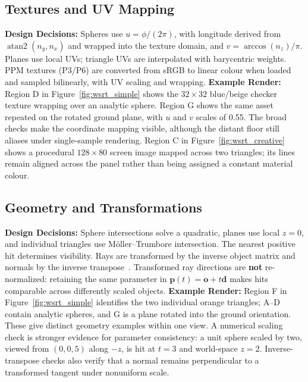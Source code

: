 \documentclass[11pt,a4paper]{article}
\begin{document}
\subsection{Textures and UV Mapping}
\textbf{Design Decisions:} Spheres use \(u=\phi/(2\pi)\), with longitude derived from $\operatorname{atan2}(n_y,n_x)$ and wrapped into the texture domain, and \(v=\arccos(n_z)/\pi\). Planes use local UVs; triangle UVs are interpolated with barycentric weights. PPM textures (P3/P6) are converted from sRGB to linear colour when loaded and sampled bilinearly, with UV scaling and wrapping.
\textbf{Example Render:}
Region D in Figure~\ref{fig:wsrt_simple} shows the $32\times32$ blue/beige checker texture wrapping over an analytic sphere. Region G shows the same asset repeated on the rotated ground plane, with $u$ and $v$ scales of 0.55. The broad checks make the coordinate mapping visible, although the distant floor still aliases under single-sample rendering. Region C in Figure~\ref{fig:wsrt_creative} shows a procedural $128\times80$ screen image mapped across two triangles; its lines remain aligned across the panel rather than being assigned a constant material colour.

\subsection{Geometry and Transformations}
\textbf{Design Decisions:} Sphere intersections solve a quadratic, planes use local $z=0$, and individual triangles use M\"oller--Trumbore intersection. The nearest positive hit determines visibility. Rays are transformed by the inverse object matrix and normals by the inverse transpose~\cite[Part~IV, Sec.~3, p.~5]{cgr-notes}. Transformed ray directions are \textbf{not} re-normalized: retaining the same parameter in $\mathbf{p}(t)=\mathbf{o}+t\mathbf{d}$ makes hits comparable across differently scaled objects.
\textbf{Example Render:}
Region F in Figure~\ref{fig:wsrt_simple} identifies the two individual orange triangles; A--D contain analytic spheres, and G is a plane rotated into the ground orientation. These give distinct geometry examples within one view. A numerical scaling check is stronger evidence for parameter consistency: a unit sphere scaled by two, viewed from $(0,0,5)$ along $-z$, is hit at $t=3$ and world-space $z=2$. Inverse-transpose checks also verify that a normal remains perpendicular to a transformed tangent under nonuniform scale.
\end{document}

